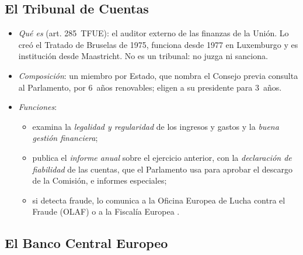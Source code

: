 \documentclass[11pt]{article}
\begin{document}
\subsection{El Tribunal de Cuentas}\label{sec:tcu}

\begin{itemize}
\item \emph{Qué es} (art. 285~TFUE): el auditor externo de las finanzas de la Unión. Lo creó el Tratado de Bruselas de 1975, funciona desde 1977 en Luxemburgo y es institución desde Maastricht. No es un tribunal: no juzga ni sanciona.
\item \emph{Composición}: un miembro por Estado, que nombra el Consejo previa consulta al Parlamento, por 6~años renovables; eligen a su presidente para 3~años.
\item \emph{Funciones}:
  \begin{itemize}
  \item examina la \emph{legalidad y regularidad} de los ingresos y gastos y la \emph{buena gestión financiera};
  \item publica el \emph{informe anual} sobre el ejercicio anterior, con la \emph{declaración de fiabilidad} de las cuentas, que el Parlamento usa para aprobar el descargo de la Comisión, e informes especiales;
  \item si detecta fraude, lo comunica a la Oficina Europea de Lucha contra el Fraude (OLAF) o a la Fiscalía Europea .
  \end{itemize}
\end{itemize}

\subsection{El Banco Central Europeo}\label{sec:bce}
\end{document}
